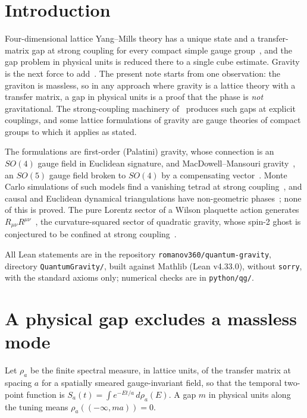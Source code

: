 \documentclass[aps,prd,twocolumn,superscriptaddress,nofootinbib]{revtex4-2}
\theoremstyle{remark}
\begin{document}
\maketitle

\section{Introduction}

Four-dimensional lattice Yang--Mills theory has a unique state and a transfer-matrix gap at strong coupling for
every compact simple gauge group~\cite{4YM}, and the gap problem in physical units is reduced there to a single cube
estimate. Gravity is the next force to add~\cite{QGL}. The present note starts from one observation: the graviton
is massless, so in any approach where gravity is a lattice theory with a transfer matrix, a gap in physical units
is a proof that the phase is \emph{not} gravitational. The strong-coupling machinery of~\cite{4YM} produces such
gaps at explicit couplings, and some lattice formulations of gravity are gauge theories of compact groups to which
it applies as stated.

The formulations are first-order (Palatini) gravity, whose connection is an $SO(4)$ gauge field in Euclidean
signature, and MacDowell--Mansouri gravity~\cite{MM}, an $SO(5)$ gauge field broken to $SO(4)$ by a compensating
vector~\cite{SW}. Monte Carlo simulations of such models find a vanishing tetrad at strong coupling~\cite{CF}, and
causal and Euclidean dynamical triangulations have non-geometric phases~\cite{CDTreview}; none of this is proved.
The pure Lorentz sector of a Wilson plaquette action generates $R_{\mu\nu}R^{\mu\nu}$~\cite{Zubkov,Gwl}, the
curvature-squared sector of quadratic gravity, whose spin-2 ghost is conjectured to be confined at strong
coupling~\cite{HR,LQA}.

All Lean statements are in the repository \texttt{romanov360/quantum-gravity}, directory \texttt{QuantumGravity/},
built against Mathlib (Lean v4.33.0), without \texttt{sorry}, with the standard axioms only; numerical checks are in
\texttt{python/qg/}.

\section{A physical gap excludes a massless mode}

Let $\rho_a$ be the finite spectral measure, in lattice units, of the transfer matrix at spacing $a$ for a
spatially smeared gauge-invariant field, so that the temporal two-point function is
$S_a(t)=\int e^{-Et/a}\,d\rho_a(E)$. A gap $m$ in physical units along the tuning means $\rho_a((-\infty,ma))=0$.
\end{document}
